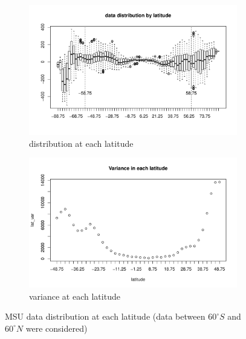 \begin{figure}[H]
	\begin{subfigure}{.5\textwidth}
		\centering
		\includegraphics[width=1\linewidth]{graphs//MSU_data_latitude}
		\caption{distribution at each latitude}
		\label{MSU_data_latitude}
	\end{subfigure}
	\begin{subfigure}{.5\textwidth}
		\centering
		\includegraphics[width=1\linewidth]{graphs/MSU_data_var_lat}
		\caption{variance at each latitude}
		\label{MSU_data_var_lat}
	\end{subfigure}
	\caption[MSU data distribution at each latitude (data between $60^\circ S$ and $60^\circ N$ were considered)]{MSU data distribution at each latitude (data between $60^\circ S$ and $60^\circ N$ were considered)}
	\label{compare_varigram_sim_2}
\end{figure}


